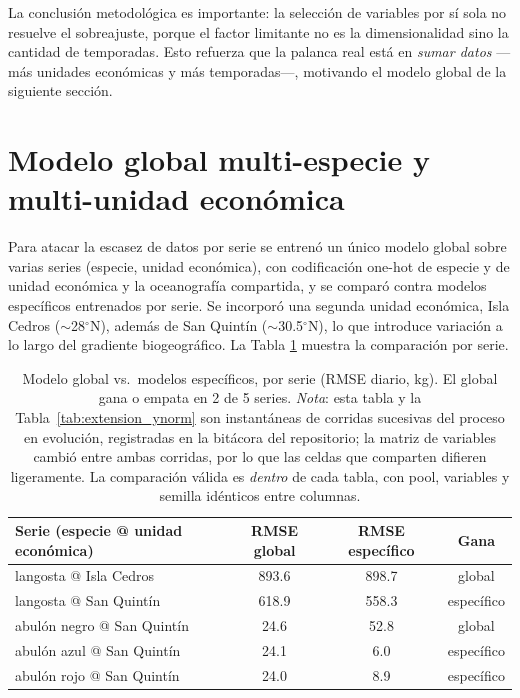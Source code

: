 La conclusión metodológica es importante: la selección de variables por sí sola no resuelve el sobreajuste, porque el factor limitante no es la dimensionalidad sino la cantidad de temporadas. Esto refuerza que la palanca real está en \emph{sumar datos} ---más unidades económicas y más temporadas---, motivando el modelo global de la siguiente sección.

\section{Modelo global multi-especie y multi-unidad económica}
Para atacar la escasez de datos por serie se entrenó un único modelo global sobre varias series (especie, unidad económica), con codificación one-hot de especie y de unidad económica y la oceanografía compartida, y se comparó contra modelos específicos entrenados por serie. Se incorporó una segunda unidad económica, Isla Cedros ($\sim$28$^\circ$N), además de San Quintín ($\sim$30.5$^\circ$N), lo que introduce variación a lo largo del gradiente biogeográfico. La Tabla \ref{tab:extension_global} muestra la comparación por serie.

\begin{table}[htbp]
\centering
\begin{tabular}{lccc}
\toprule
Serie (especie @ unidad económica) & RMSE global & RMSE específico & Gana \\
\midrule
langosta @ Isla Cedros & 893.6 & 898.7 & global \\
langosta @ San Quintín & 618.9 & 558.3 & específico \\
abulón negro @ San Quintín & 24.6 & 52.8 & global \\
abulón azul @ San Quintín & 24.1 & 6.0 & específico \\
abulón rojo @ San Quintín & 24.0 & 8.9 & específico \\
\bottomrule
\end{tabular}
\caption{Modelo global vs.\ modelos específicos, por serie (RMSE diario, kg). El global gana o empata en 2 de 5 series. \emph{Nota}: esta tabla y la Tabla~\ref{tab:extension_ynorm} son instantáneas de corridas sucesivas del proceso en evolución, registradas en la bitácora del repositorio; la matriz de variables cambió entre ambas corridas, por lo que las celdas que comparten difieren ligeramente. La comparación válida es \emph{dentro} de cada tabla, con pool, variables y semilla idénticos entre columnas.}
\label{tab:extension_global}
\end{table}

